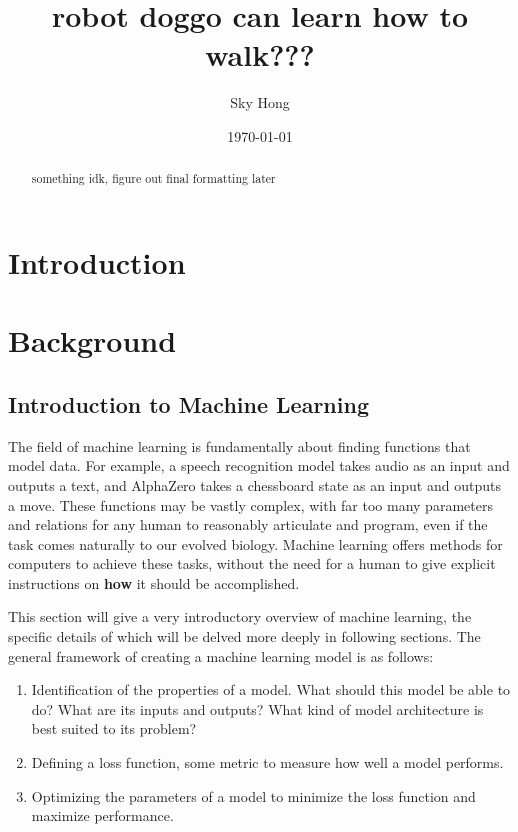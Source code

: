 \documentclass[12pt]{report}
\theoremstyle{definition}
\theoremstyle{remark}
\begin{document}
\title{robot doggo can learn how to walk???}
\author{Sky Hong}
\date{\today}
\maketitle

\begin{abstract}
    something idk, figure out final formatting later
\end{abstract}


\tableofcontents

\chapter{Introduction}

\chapter{Background}
\section{Introduction to Machine Learning}
The field of machine learning is fundamentally about finding functions that model data. For example, a speech recognition model takes audio as an input and outputs a text, and AlphaZero takes a chessboard state as an input and outputs a move. These functions may be vastly complex, with far too many parameters and relations for any human to reasonably articulate and program, even if the task comes naturally to our evolved biology. Machine learning offers methods for computers to achieve these tasks, without the need for a human to give explicit instructions on \textbf{how} it should be accomplished.

This section will give a very introductory overview of machine learning, the specific details of which will be delved more deeply in following sections. The general framework of creating a machine learning model is as follows:

\begin{enumerate}
    \item Identification of the properties of a model. What should this model be able to do? What are its inputs and outputs? What kind of model architecture is best suited to its problem?
    \item Defining a loss function, some metric to measure how well a model performs.
    \item Optimizing the parameters of a model to minimize the loss function and maximize performance.
\end{enumerate}
\end{document}
